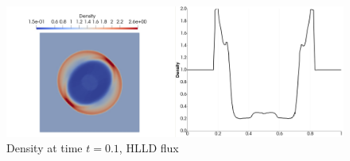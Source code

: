 	\begin{figure}[H]
		\begin{center}
			\includegraphics[width=\textwidth]{img/numflux/hl-0.jpg}
			\vspace{-3mm}
		\caption{Density at time $t = 0.1$, HLLD flux}
		\end{center}
		\label{numFluxCompare2}
	\end{figure}\vspace{-7mm}
	\newpage
	
